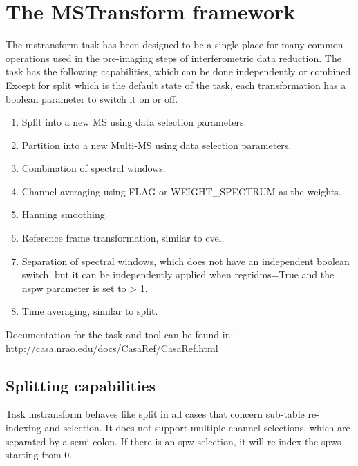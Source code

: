 

\section{The MSTransform framework}\label{Sec:Running}
The mstransform task has been designed to be a single place for many
common operations used in the pre-imaging steps of interferometric
data reduction. The task has the following capabilities, which can be done
independently or combined. Except for split which is the default state of 
the task, each transformation has a boolean parameter to switch it on
or off.

\begin{enumerate}
\item Split into a new MS using data selection parameters.
\item Partition into a new Multi-MS using data selection parameters.
\item Combination of spectral windows.
\item Channel averaging using FLAG or WEIGHT_SPECTRUM as the weights.
\item Hanning smoothing.
\item Reference frame transformation, similar to cvel.
\item Separation of spectral windows, which does not have an independent
boolean switch, but it can be independently applied when regridms=True and
the nspw parameter is set to > 1.
\item Time averaging, similar to split.

\end{enumerate}


Documentation for the task and tool can be found in:
 {http://casa.nrao.edu/docs/CasaRef/CasaRef.html}

\subsection{Splitting capabilities}
Task mstransform behaves like split in all cases that concern sub-table re-indexing
and selection. It does not support multiple channel selections, which are separated by
a semi-colon. If there is an spw selection, it will re-index the spws starting from 0.

